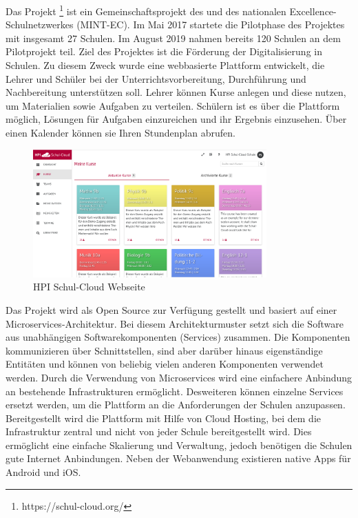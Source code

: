 Das Projekt \schulCloud\footnote{https://schul-cloud.org/} ist ein Gemeinschaftsprojekt des \hpi und des nationalen Excellence-Schulnetzwerkes (MINT-EC). Im Mai 2017 startete die Pilotphase des Projektes mit insgesamt 27 Schulen. Im August 2019 nahmen bereits 120 Schulen an dem Pilotprojekt teil.\cite{blog-sc} Ziel des Projektes ist die Förderung der Digitalisierung in Schulen. 
Zu diesem Zweck wurde eine webbasierte Plattform entwickelt, die Lehrer und Schüler bei der Unterrichtsvorbereitung, Durchführung und Nachbereitung unterstützen soll. 
Lehrer können Kurse anlegen und diese nutzen, um Materialien sowie Aufgaben zu verteilen. Schülern ist es über die Plattform möglich, Lösungen für Aufgaben einzureichen und ihr Ergebnis einzusehen. Über einen Kalender können sie Ihren Stundenplan abrufen.
\begin{figure}[!h]
	\centering
	\includegraphics[width=0.8\textwidth]{figures/screenshot_schul-cloud}
	\caption[HPI Schul-Cloud Webseite]{HPI Schul-Cloud Webseite}
	\label{fig:screenshot_schul-clould}
\end{figure}

Das Projekt wird als Open Source zur Verfügung gestellt und basiert auf einer Microservices-Architektur. Bei diesem Architekturmuster setzt sich die Software aus unabhängigen Softwarekomponenten (Services) zusammen. Die Komponenten kommunizieren über Schnittstellen, sind aber darüber hinaus eigenständige Entitäten und können von beliebig vielen anderen Komponenten verwendet werden. Durch die Verwendung von Microservices wird eine einfachere Anbindung an bestehende Infrastrukturen ermöglicht. Desweiteren können einzelne Services ersetzt werden, um die Plattform an die Anforderungen der Schulen anzupassen. Bereitgestellt wird die Plattform mit Hilfe von Cloud Hosting, bei dem die Infrastruktur zentral und nicht von jeder Schule bereitgestellt wird. Dies ermöglicht eine einfache Skalierung und Verwaltung, jedoch benötigen die Schulen gute Internet Anbindungen. Neben der Webanwendung existieren native Apps für Android und iOS.

